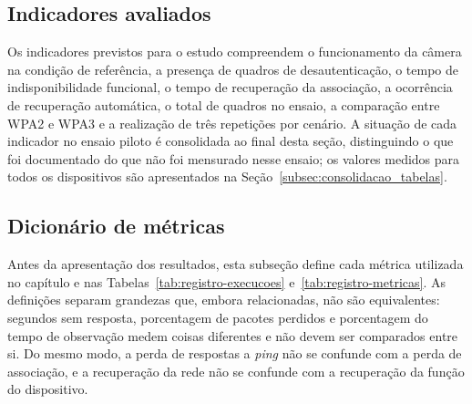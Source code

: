 \subsection{Indicadores avaliados}

Os indicadores previstos para o estudo compreendem o funcionamento da câmera na condição de referência, a presença de quadros de desautenticação, o tempo de indisponibilidade funcional, o tempo de recuperação da associação, a ocorrência de recuperação automática, o total de quadros no ensaio, a comparação entre WPA2 e WPA3 e a realização de três repetições por cenário. A situação de cada indicador no ensaio piloto é consolidada ao final desta seção, distinguindo o que foi documentado do que não foi mensurado nesse ensaio; os valores medidos para todos os dispositivos são apresentados na Seção~\ref{subsec:consolidacao_tabelas}.

\subsection{Dicionário de métricas}
\label{subsec:dicionario_metricas}

Antes da apresentação dos resultados, esta subseção define cada métrica utilizada no capítulo e nas Tabelas~\ref{tab:registro-execucoes} e~\ref{tab:registro-metricas}. As definições separam grandezas que, embora relacionadas, não são equivalentes: segundos sem resposta, porcentagem de pacotes perdidos e porcentagem do tempo de observação medem coisas diferentes e não devem ser comparados entre si. Do mesmo modo, a perda de respostas a \textit{ping} não se confunde com a perda de associação, e a recuperação da rede não se confunde com a recuperação da função do dispositivo.

